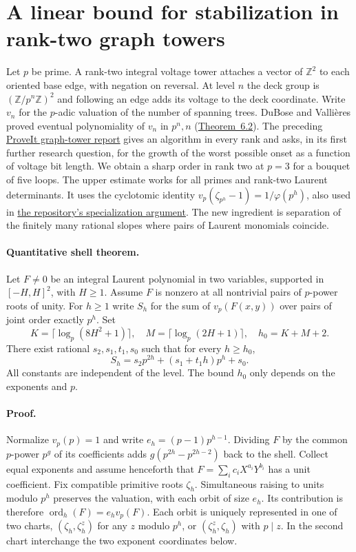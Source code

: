 \section{A linear bound for stabilization in rank-two graph towers}
\label{sec:rank-two-onset}
Let $p$ be prime. A rank-two integral voltage tower attaches a vector of
$\mathbb Z^2$ to each oriented base edge, with negation on reversal. At
level $n$ the deck group is $(\mathbb Z/p^n\mathbb Z)^2$ and following
an edge adds its voltage to the deck coordinate. Write $v_n$ for the
$p$-adic valuation of the number of spanning trees. DuBose and
Vallières proved eventual polynomiality of $v_n$ in $p^n,n$
(\href{https://doi.org/10.5802/alco.304}{Theorem~6.2}).
The preceding \href{https://github.com/VladimirReshetnikov/ProveIt/blob/bd8864aa31430944f587f544213d562665f1d817/docs/incoming/Effective_Graph_Towers.zip}{ProveIt graph-tower report}
gives an algorithm in every rank and asks, in its first further research
question, for the growth of the worst possible onset as a function of
voltage bit length. We obtain a sharp order in rank two at $p=3$ for a
bouquet of five loops. The upper estimate works for all primes and
rank-two Laurent determinants. It uses the cyclotomic identity
$v_p(\zeta_{p^h}-1)=1/\varphi(p^h)$, also used in
\href{https://github.com/lsernau/grh-lean/blob/72fead102f663d5c7a407964a13dc0cf9d977207/grh/src/New/Congruences/Selmer/RootsOfUnity.lean}{the repository's specialization argument}.
The new ingredient is separation of the finitely many rational slopes
where pairs of Laurent monomials coincide.

\paragraph{Quantitative shell theorem.}
Let $F\ne0$ be an integral Laurent polynomial in two variables,
supported in $[-H,H]^2$, with $H\ge1$. Assume $F$ is nonzero at all
nontrivial pairs of $p$-power roots of unity. For $h\ge1$ write
$S_h$ for the sum of $v_p(F(x,y))$ over pairs of joint order exactly
$p^h$. Set
\[
 K=\lceil\log_p(8H^2+1)\rceil,\quad
 M=\lceil\log_p(2H+1)\rceil,\quad h_0=K+M+2.
\]
There exist rational $s_2,s_1,t_1,s_0$ such that for every $h\ge h_0$,
\[
 S_h=s_2p^{2h}+(s_1+t_1 h)p^h+s_0.
\]
All constants are independent of the level. The bound $h_0$ only
depends on the exponents and $p$.

\paragraph{Proof.}
Normalize $v_p(p)=1$ and write $e_h=(p-1)p^{h-1}$.
Dividing $F$ by the common $p$-power $p^g$ of its coefficients adds
$g(p^{2h}-p^{2h-2})$ back to the shell. Collect equal exponents and
assume henceforth that $F=\sum_i c_i X^{a_i}Y^{b_i}$ has a unit
coefficient. Fix compatible primitive roots $\zeta_h$. Simultaneous
raising to units modulo $p^h$ preserves the valuation, with each
orbit of size $e_h$. Its contribution is therefore
$\operatorname{ord}_h(F)=e_h v_p(F)$. Each orbit is uniquely
represented in one of two charts, $(\zeta_h,\zeta_h^z)$ for any $z$
modulo $p^h$, or $(\zeta_h^z,\zeta_h)$ with $p\mid z$. In the
second chart interchange the two exponent coordinates below.

